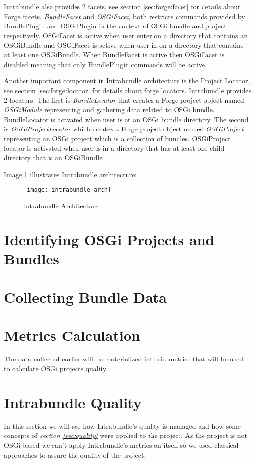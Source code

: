 Intrabundle also provides 2 facets, see section \ref{sec:forge:facet} for details about Forge facets. \emph{BundleFacet} and \emph{OSGiFacet}, both restricts commands provided by BundlePlugin and OSGiPlugin in the context of OSGi bundle and project respectively. OSGiFacet is active when user enter on a directory that contains an OSGiBundle and OSGiFacet is active when user in on a directory that contains at least one OSGiBundle. When BundleFacet is active then OSGiFacet is disabled meaning that only BundlePlugin commands will be active. 

Another important component in Intrabundle architecture is the Project Locator, see section \ref{sec:forge:locator} for details about forge locators. Intrabundle provides 2 locators. The first is \emph{BundleLocator} that creates a Forge project object named \emph{OSGiModule} representing and gathering data related to OSGi bundle. BundleLocator is actvated when user is at an OSGi bundle directory. The second is \emph{OSGiProjectLocator} which creates a Forge project object named \emph{OSGiProject} representing an OSGi project which is a collection of bundles. OSGiProject locator is activated when user is in a directory that has at least one child directory that is an OSGiBundle.          

Image \ref{intrabundle-arch} illustrates Intrabundle architecture:

\begin{figure}[h]
\caption{Intrabundle Architecture}
\label{intrabundle-arch}
\centering
\texttt{[image: intrabundle-arch]}
\end{figure}  
\FloatBarrier


\section{Identifying OSGi Projects and Bundles}

\section{Collecting Bundle Data}

\section{Metrics Calculation}
The data collected earlier will be materialized into six metrics that will be used to calculate OSGi projects quality  

\section{Intrabundle Quality}
In this section we will see how Intrabundle's quality is managed and how some concepts of \textit{section \ref{sec:quality}} were applied to the project. As the project is not OSGi based we can't apply Intrabundle's metrics on itself so we used classical approaches to assure the quality of the project.

